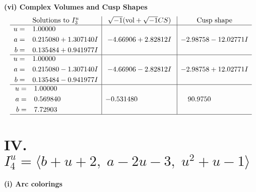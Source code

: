 \documentclass[1p]{elsarticle_modified}
\theoremstyle{definition}
\newcommand{\I}{\sqrt{-1}}
\begin{document}
\newpage\flushleft \textbf{(vi) Complex Volumes and Cusp Shapes}
$$\begin{array}{c|c|c}  
\text{Solutions to }I^u_{3}& \I (\text{vol} + \sqrt{-1}CS) & \text{Cusp shape}\\
 \hline 
\begin{aligned}
u &= \phantom{-}1.00000\phantom{ +0.000000I} \\
a &= \phantom{-}0.215080 + 1.307140 I \\
b &= \phantom{-}0.135484 + 0.941977 I\end{aligned}
 & -4.66906 + 2.82812 I & -2.98758 - 12.02771 I \\ \hline\begin{aligned}
u &= \phantom{-}1.00000\phantom{ +0.000000I} \\
a &= \phantom{-}0.215080 - 1.307140 I \\
b &= \phantom{-}0.135484 - 0.941977 I\end{aligned}
 & -4.66906 - 2.82812 I & -2.98758 + 12.02771 I \\ \hline\begin{aligned}
u &= \phantom{-}1.00000\phantom{ +0.000000I} \\
a &= \phantom{-}0.569840\phantom{ +0.000000I} \\
b &= \phantom{-}7.72903\phantom{ +0.000000I}\end{aligned}
 & -0.531480\phantom{ +0.000000I} & \phantom{-}90.9750\phantom{ +0.000000I}\\
 \hline 
 \end{array}$$\newpage\newpage\renewcommand{\arraystretch}{1}
\centering \section*{IV. $I^u_{4}= \langle b+u+2,\;a-2 u-3,\;u^2+u-1 \rangle$}
\flushleft \textbf{(i) Arc colorings}\\
\end{document}
